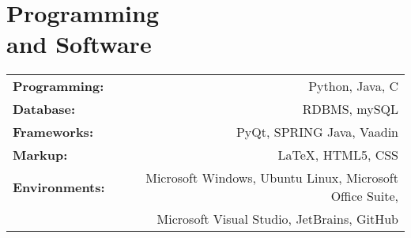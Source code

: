 \section{\sc Programming\\ and Software}
\begin{tabular}{lr}
	\textbf{Programming:} & Python, Java, C\\
	\textbf{Database:} & RDBMS, mySQL\\
	\textbf{Frameworks:} & PyQt, SPRING Java, Vaadin\\
	\textbf{Markup:} & \LaTeX, HTML5, CSS\\
	\textbf{Environments:} & Microsoft Windows, Ubuntu Linux, Microsoft Office Suite,\\
	& Microsoft Visual Studio, JetBrains, GitHub
\end{tabular}